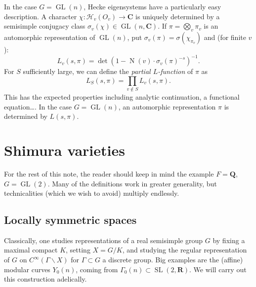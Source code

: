 \documentclass{article}
\DeclareMathOperator{\GL}{GL}
\DeclareMathOperator{\norm}{N}
\DeclareMathOperator{\SL}{SL}
\newcommand{\dC}{\mathbf{C}}
\newcommand{\dR}{\mathbf{R}}
\newcommand{\dQ}{\mathbf{Q}}
\newcommand{\hecke}{\mathcal{H}}
\begin{document}
In the case $G=\GL(n)$, Hecke eigensystems have a particularly easy 
description. A character $\chi:\hecke_v(O_v)\to \dC$ is uniquely determined by 
a semisimple conjugacy class $\sigma_v(\chi)\in \GL(n,\dC)$. If 
$\pi=\bigotimes_v \pi_v$ is an automorphic representation of $\GL(n)$, put 
$\sigma_v(\pi) = \sigma(\chi_{\pi_v})$ and (for finite $v$): 
\[
  L_v(s,\pi) = \det\left(1-\norm(v)\cdot \sigma_v(\pi)^{-s}\right)^{-1} .
\]
For $S$ sufficiently large, we can define the \emph{partial $L$-function} of 
$\pi$ as 
\[
  L_S(s,\pi) = \prod_{v\notin S} L_v(s,\pi) .
\]
This has the expected properties including analytic continuation, a functional 
equation\ldots. In the case $G=\GL(n)$, an automorphic representation $\pi$ is 
determined by $L(s,\pi)$. 





\section{Shimura varieties}

For the rest of this note, the reader should keep in mind the example 
$F=\dQ$, $G=\GL(2)$. Many of the definitions work in greater generality, 
but technicalities (which we wish to avoid) multiply endlessly. 


\subsection{Locally symmetric spaces}\label{sec:local-symm}

Classically, one studies representations of a real semisimple group $G$ by 
fixing a maximal compact $K$, setting $X=G/K$, and studying the regular 
representation of $G$ on $C^\infty(\Gamma\backslash X)$ for $\Gamma\subset G$ 
a discrete group. Big examples are the (affine) modular curves $Y_0(n)$, 
coming from $\Gamma_0(n)\subset \SL(2,\dR)$. We will carry out this 
construction adelically. 
\end{document}
